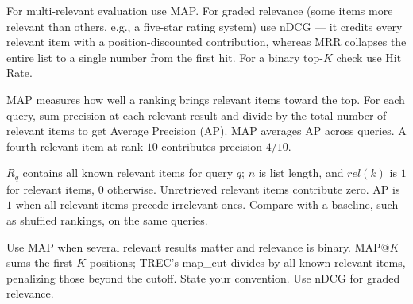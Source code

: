 \metricsecondary

For multi-relevant evaluation use MAP. For graded relevance (some items more relevant than others, e.g., a five-star rating system) use nDCG — it credits every relevant item with a position-discounted contribution, whereas MRR collapses the entire list to a single number from the first hit. For a binary top-$K$ check use Hit Rate.


\metricend
\clearpage
\thispagestyle{rankingstyle}
\label{sec:map}

MAP measures how well a ranking brings relevant items toward the top. For each query, sum precision at each relevant result and divide by the total number of relevant items to get Average Precision (AP). MAP averages AP across queries. A fourth relevant item at rank $10$ contributes precision $4/10$.

\begin{metricformula}
\end{metricformula}

$R_q$ contains all known relevant items for query $q$; $n$ is list length, and $rel(k)$ is $1$ for relevant items, $0$ otherwise. Unretrieved relevant items contribute zero. AP is $1$ when all relevant items precede irrelevant ones. Compare with a baseline, such as shuffled rankings, on the same queries.


Use MAP when several relevant results matter and relevance is binary. MAP@$K$ sums the first $K$ positions; TREC's map\_cut divides by all known relevant items, penalizing those beyond the cutoff. State your convention. Use nDCG for graded relevance.


